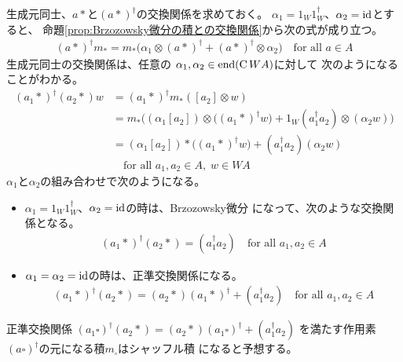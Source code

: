 		生成元同士、$a*$と$(a*)^\dag$の交換関係を求めておく。
		$\alpha_1=1_W1_W^\dag$、$\alpha_2={\operatorname{id}}$とすると、
		命題\ref{prop:Brzozowsky微分の積との交換関係}から次の式が成り立つ。
		\begin{equation*}\begin{split} %
			(a*)^\dag m_* 
			= m_*\bigl(\alpha_1\otimes (a*)^\dag+(a*)^\dag\otimes \alpha_2\bigr)
			\quad\text{for all }a\in A
		\end{split}\end{equation*} %
		生成元同士の交換関係は、任意の
		$\alpha_1,\alpha_2\in\operatorname{end}(\operatorname{C}WA)$に対して
		次のようになることがわかる。
		\begin{equation*}\begin{split} %
			(a_1*)^\dag(a_2*)w &= (a_1*)^\dag m_*([a_2]\otimes w) \\
			&= m_*\biggl((\alpha_1[a_2])\otimes \bigl((a_1*)^\dag w\bigr)
			+ 1_W(a_1^\dag a_2)\otimes (\alpha_2w)\biggr) \\
			&= (\alpha_1[a_2])*\bigl((a_1*)^\dag w\bigr)
			+ (a_1^\dag a_2)(\alpha_2w) \\
			&\quad\text{for all }a_1,a_2\in A,\;w\in WA
		\end{split}\end{equation*} %
		$\alpha_1$と$\alpha_2$の組み合わせで次のようになる。
		\begin{itemize}\setlength{\itemsep}{-1mm} %
			\item $\alpha_1=1_W1_W^\dag$、$\alpha_2={\operatorname{id}}$の時は、Brzozowsky微分
			になって、次のような交換関係となる。
			\begin{equation*}\begin{split} %
				(a_1*)^\dag(a_2*) = (a_1^\dag a_2)
				\quad\text{for all }a_1,a_2\in A
			\end{split}\end{equation*} %
			\item $\alpha_1=\alpha_2={\operatorname{id}}$の時は、正準交換関係になる。
			\begin{equation*}\begin{split} %
				(a_1*)^\dag(a_2*) = (a_2*)(a_1*)^\dag + (a_1^\dag a_2)
				\quad\text{for all }a_1,a_2\in A
			\end{split}\end{equation*} %
		\end{itemize} %

		\begin{todo}[正準交換関係]\label{todo:正準交換関係} %
			正準交換関係
			$(a_1\square)^\dag(a_2*) = (a_2*)(a_1\square)^\dag+(a_1^\dag a_2)$
			を満たす作用素$(a\square)^\dag$の元になる積$m_\square$はシャッフル積
			になると予想する。
		\end{todo} %

